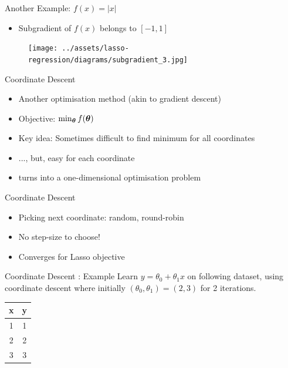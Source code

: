 \documentclass{beamer}
\begin{document}
\begin{frame}{Another Example: $f(x) = |x|$}

\begin{itemize}
\item Subgradient of $f(x)$ belongs to $[-1, 1]$
\end{itemize}
\begin{figure}
\centering
\texttt{[image: ../assets/lasso-regression/diagrams/subgradient\_3.jpg]}
\label{fig:my_label}
\end{figure}
\end{frame}

\begin{frame}{Coordinate Descent}
\begin{itemize}[<+->]
	\item Another optimisation method (akin to gradient descent)
	\item Objective: $\min_{\boldsymbol{\theta}} f(\boldsymbol{\theta})$
	\item Key idea: Sometimes difficult to find minimum for all coordinates
	\item ..., but, easy for each coordinate
	\item turns into a one-dimensional optimisation problem
\end{itemize}
\end{frame}

%


\begin{frame}{Coordinate Descent}
\begin{itemize}[<+->]
\item Picking next coordinate: \pause random, round-robin
\item No step-size to choose!
\item Converges for Lasso objective
\end{itemize}
\end{frame}




\begin{frame}{Coordinate Descent : Example}
Learn $y = \theta_0 + \theta_1 x$ on following dataset, using coordinate descent where initially $(\theta_0, \theta_1) = (2,3)$  for 2 iterations. 
\begin{table}[]
\centering
\label{tab:my-table}
\begin{tabular}{|c|c|}
\hline
\textbf{x} & \textbf{y} \\ \hline
1 & 1 \\ \hline
2 & 2 \\ \hline
3 & 3 \\ \hline
\end{tabular}
\end{table}
\end{frame}
\end{document}
